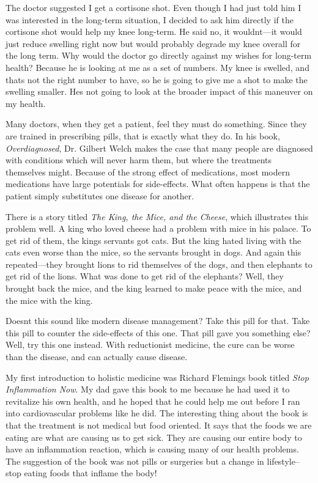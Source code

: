 The doctor suggested I get a cortisone shot. Even though I had just told
him I was interested in the long-term situation, I decided to ask him
directly if the cortisone shot would help my knee long-term. He said
no, it wouldn{\textquotesingle}t—it would just reduce swelling right
now but would probably degrade my knee overall for the long term. Why
would the doctor go directly against my wishes for long-term health? 
Because he is looking at me as a set of numbers. My knee is swelled,
and that{\textquotesingle}s not the right number to have, so he is
going to give me a shot to make the swelling smaller.
He{\textquotesingle}s not going to look at the broader impact of this
maneuver on my health.


Many doctors, when they get a patient, feel they must do something.
Since they are trained in prescribing pills, that is exactly what they
do.  In his book, \textit{Overdiagnosed}, Dr. Gilbert Welch makes the
case that many people are diagnosed with conditions which will never
harm them, but where the treatments themselves might.  Because of the
strong effect of medications, most modern medications have large
potentials for side-effects. What often happens is that the patient
simply substitutes one disease for another. 


There is a story titled \textit{The King, the Mice, and the Cheese},
which illustrates this problem well. A king who loved cheese had a
problem with mice in his palace. To get rid of them, the
king{\textquotesingle}s servants got cats. But the king hated living
with the cats even worse than the mice, so the servants brought in
dogs. And again this repeated—they brought lions to rid themselves of
the dogs, and then elephants to get rid of the lions. What was done to
get rid of the elephants?  Well, they brought back the mice, and the
king learned to make peace with the mice, and the mice with the king.


Doesn{\textquotesingle}t this sound like modern disease management? 
Take this pill for that. Take this pill to counter the side-effects of
this one. That pill gave you something else?  Well, try this one
instead. With reductionist medicine, the cure can be worse than the
disease, and can actually cause disease.


 My first introduction to holistic medicine was Richard
Fleming{\textquotesingle}s book titled \textit{Stop Inflammation Now}.
My dad gave this book to me because he had used it to revitalize his
own health, and he hoped that he could help me out before I ran into
cardiovascular problems like he did. The interesting thing about the
book is that the treatment is not medical but food oriented. It says
that the foods we are eating are what are causing us to get sick. They
are causing our entire body to have an inflammation reaction, which is
causing many of our health problems. The suggestion of the book was not
pills or surgeries but a change in lifestyle–stop eating foods that
inflame the body!


